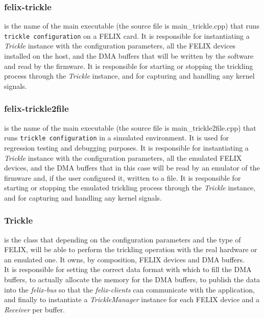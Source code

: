 \subsubsection{felix-trickle} is the name of the main executable (the source file is main\_trickle.cpp) that runs \texttt{trickle\ configuration} on a \acs{FELIX} card. It is responsible for instantiating a \emph{Trickle} instance with the configuration parameters, all the \acs{FELIX} devices installed on the host, and the \acs{DMA} buffers that will be written by the software and read by the firmware. It is responsible for starting or stopping the trickling process through the \emph{Trickle} instance, and for capturing and handling any kernel signals.

\subsubsection{felix-trickle2file} is the name of the main executable (the source file is main\_trickle2file.cpp) that runs \texttt{trickle configuration} in a simulated environment. It is used for regression testing and debugging purposes. It is responsible for instantiating a \emph{Trickle} instance with the configuration parameters, all the emulated \acs{FELIX} devices, and the \acs{DMA} buffers that in this case will be read by an emulator of the firmware and, if the user configured it, written to a file. It is responsible for starting or stopping the emulated trickling process through the \emph{Trickle} instance, and for capturing and handling any kernel signals.

\subsubsection{Trickle} is the class that depending on the configuration parameters and the type of \acs{FELIX}, will be able to perform the trickling operation with the real hardware or an emulated one. It owns, by composition, \acs{FELIX} devices and \acs{DMA} buffers.\\
It is responsible for setting the correct data format with which to fill the \acs{DMA} buffers, to actually allocate the memory for the \acs{DMA} buffers, to publish the data into the \emph{felix-bus} so that the \emph{felix-clients} can communicate with the application, and finally to instantiate a \emph{TrickleManager} instance for each \acs{FELIX} device and a \emph{Receiver} per buffer.

